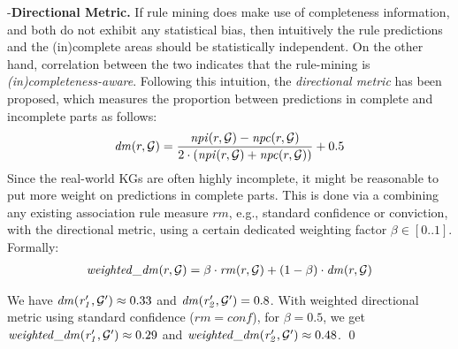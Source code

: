 \noindent -\textbf{Directional Metric.} If rule mining does make use of completeness information, and both do not exhibit any statistical bias, then intuitively the rule predictions and the (in)complete areas should be statistically independent. On the other hand, correlation between the two indicates that the rule-mining is \emph{(in)completeness-aware}. Following this intuition, the \emph{directional metric} has been proposed, which measures the proportion between predictions in complete and incomplete parts as follows:
\begin{align*}
\mathit{dm}(r,\mathcal{G}) = \frac{\mathit{npi}(r,\mathcal{G})-\mathit{npc}(r,\mathcal{G})}{2\cdot(\mathit{npi}(r,\mathcal{G})+\mathit{npc}(r,\mathcal{G}))}+0.5
\end{align*}
Since the real-world KGs are often highly incomplete, it might be reasonable to put more weight on predictions in complete parts. This is done via a %
combining any existing association rule measure $rm$, e.g., standard confidence or conviction, with 
the directional metric, using a certain dedicated weighting factor $\beta \in [0..1]$. Formally:
\begin{align*}
\mathit{weighted\_dm}(r,\mathcal{G})=\beta \cdot \mathit{rm}(r,\mathcal{G}) + (1-\beta) \cdot \mathit{dm}(r,\mathcal{G}) 
\end{align*}
\begin{example}
We have $\mathit{dm(r_1',\mathcal{G}')}\approx 0.33$ and $\mathit{dm(r_2',\mathcal{G}')}=0.8$. With weighted directional metric using standard confidence ($rm = conf$), for $\beta=0.5$, we get $\mathit{weighted\_dm(r_1',\mathcal{G}')} \approx 0.29$ and $\mathit{weighted\_dm(r_2',\mathcal{G}')} \approx 0.48$. \qed
\end{example}

